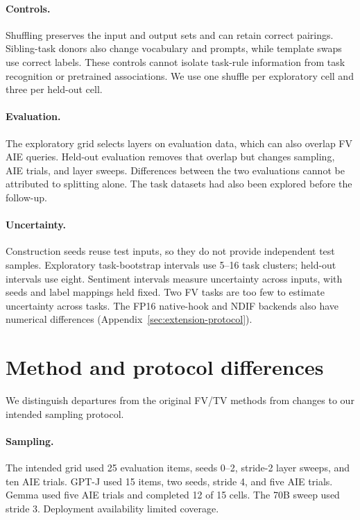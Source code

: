 \documentclass[11pt]{article}
\begin{document}
\paragraph{Controls.} Shuffling preserves the input and output sets and can retain correct pairings. Sibling-task donors also change vocabulary and prompts, while template swaps use correct labels. These controls cannot isolate task-rule information from task recognition or pretrained associations. We use one shuffle per exploratory cell and three per held-out cell.

\paragraph{Evaluation.} The exploratory grid selects layers on evaluation data, which can also overlap FV AIE queries. Held-out evaluation removes that overlap but changes sampling, AIE trials, and layer sweeps. Differences between the two evaluations cannot be attributed to splitting alone. The task datasets had also been explored before the follow-up.

\paragraph{Uncertainty.} Construction seeds reuse test inputs, so they do not provide independent test samples. Exploratory task-bootstrap intervals use 5--16 task clusters; held-out intervals use eight. Sentiment intervals measure uncertainty across inputs, with seeds and label mappings held fixed. Two FV tasks are too few to estimate uncertainty across tasks. The FP16 native-hook and NDIF backends also have numerical differences (Appendix~\ref{sec:extension-protocol}).



\appendix

\section{Method and protocol differences}
\label{sec:deviations}

We distinguish departures from the original FV/TV methods from changes to our intended sampling protocol.

\paragraph{Sampling.} The intended grid used 25 evaluation items, seeds 0--2, stride-2 layer sweeps, and ten AIE trials. GPT-J used 15 items, two seeds, stride 4, and five AIE trials. Gemma used five AIE trials and completed 12 of 15 cells. The 70B sweep used stride 3. Deployment availability limited coverage.
\end{document}
